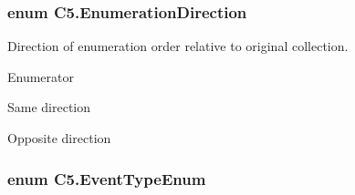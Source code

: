 \subsubsection[{Enumeration\+Direction}]{\setlength{\rightskip}{0pt plus 5cm}enum {\bf C5.\+Enumeration\+Direction}\hspace{0.3cm}{\ttfamily [strong]}}\label{namespace_c5_aad282676794e49130eb8caed289395f8}


Direction of enumeration order relative to original collection. 

\begin{Desc}
\item[Enumerator]\par
\begin{description}
\item[{\em 
\hypertarget{namespace_c5_aad282676794e49130eb8caed289395f8a1e411b48c18c85a91ad46b53ebb24d6a}{}Forwards\label{namespace_c5_aad282676794e49130eb8caed289395f8a1e411b48c18c85a91ad46b53ebb24d6a}
}]Same direction \item[{\em 
\hypertarget{namespace_c5_aad282676794e49130eb8caed289395f8a9d1104e419414f4c268be7211fb8fc4a}{}Backwards\label{namespace_c5_aad282676794e49130eb8caed289395f8a9d1104e419414f4c268be7211fb8fc4a}
}]Opposite direction \end{description}
\end{Desc}
\hypertarget{namespace_c5_a9143bfd561fffa025d21561674758008}{}
\subsubsection[{Event\+Type\+Enum}]{\setlength{\rightskip}{0pt plus 5cm}enum {\bf C5.\+Event\+Type\+Enum}\hspace{0.3cm}{\ttfamily [strong]}}\label{namespace_c5_a9143bfd561fffa025d21561674758008}




